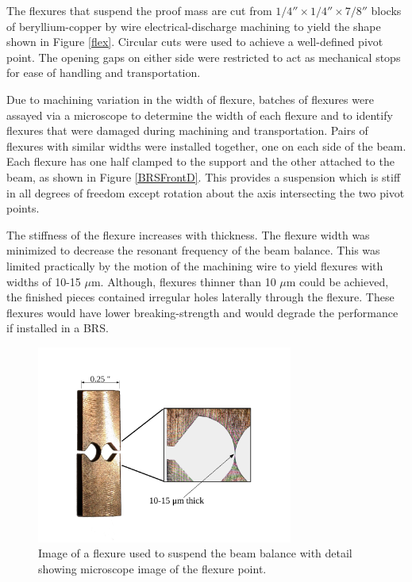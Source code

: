 \documentclass [12pt, proquest]{uwthesis}[2019]
\begin{document}
The flexures that suspend the proof mass are cut from $1/4''\times1/4''\times7/8''$ blocks of beryllium-copper by wire electrical-discharge machining to yield the shape shown in Figure \ref{flex}. Circular cuts were used to achieve a well-defined pivot point. The opening gaps on either side were restricted to act as mechanical stops for ease of handling and transportation.

Due to machining variation in the width of flexure, batches of flexures were assayed via a microscope to determine the width of each flexure and to identify flexures that were damaged during machining and transportation. Pairs of flexures with similar widths were installed together, one on each side of the beam. Each flexure has one half clamped to the support and the other attached to the beam, as shown in Figure \ref{BRSFrontD}. This provides a suspension which is stiff in all degrees of freedom except rotation about the axis intersecting the two pivot points. 

The stiffness of the flexure increases with thickness. The flexure width was minimized to decrease the resonant frequency of the beam balance. This was limited practically by the motion of the machining wire to yield flexures with widths of 10-15 $\mu$m. Although, flexures thinner than 10 $\mu$m could be achieved, the finished pieces contained irregular holes laterally through the flexure. These flexures would have lower breaking-strength and would degrade the performance if installed in a BRS. 

\begin{figure}[!h]
\begin{center}
 \includegraphics[width=0.75\textwidth]{Flexure.pdf}
\caption[Image of a BRS flexure]{Image of a flexure used to suspend the beam balance with detail showing microscope image of the flexure point.}
\label{flexure}
\end{center}
\end{figure}
\end{document}
